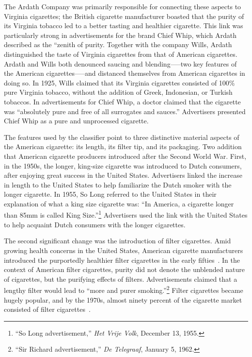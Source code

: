 \documentclass[USenglish]{article}
\begin{document}
The Ardath Company was primarily responsible for connecting these aspects to Virginia cigarettes; the British cigarette manufacturer boasted that the purity of its Virginia tobacco led to a better tasting and healthier cigarette. This link was particularly strong in advertisements for the brand Chief Whip, which Ardath described as the ``zenith of purity. Together with the company Wills, Ardath distinguished the taste of Virginia cigarettes from that of American cigarettes. Ardath and Wills both denounced saucing and blending--—two key features of the American cigarettes—--and distanced themselves from American cigarettes in doing so. In 1925, Wills claimed that its Virginia cigarettes consisted of 100\% pure Virginia tobacco, without the addition of Greek, Indonesian, or Turkish tobaccos. In advertisements for Chief Whip, a doctor claimed that the cigarette was ``absolutely pure and free of all surrogates and sauces.'' Advertisers presented Chief Whip as a pure and unprocessed cigarette.

The features used by the classifier point to three distinctive material aspects of the American cigarette: its length, its filter tip, and its packaging. Two addition that American cigarette producers introduced after the Second World War. 
%
First, in the 1950s, the longer, king-size cigarette was introduced to Dutch consumers, after enjoying great success in the United States. Advertisers linked the increase in length to the United States to help familiarize the Dutch smoker with the longer cigarette. In 1955, So Long referred to the United States in their explanation of what a king size cigarette was: ``In America, a cigarette longer than 85mm is called King Size.''\footnote{``So Long advertisement,'' \textit{Het Vrije Volk}, December 13, 1955.} Advertisers used the link with the United States to help acquaint Dutch consumers with the longer cigarettes.

The second significant change was the introduction of filter cigarettes. Amid growing health concerns in the United States, American cigarette manufacturers introduced the purportedly healthier filter cigarettes in the early fifties~\cite[244]{brandt_cigarette_2009}. In the context of American filter cigarettes, purity did not denote the unblended nature of cigarettes, but the purifying effects of filters. Advertisements claimed that a lengthy filter would lead to ``more and purer smoking.''\footnote{``Sir Richard advertisement,'' \textit{De Telegraaf}, January 5, 1962.} Filter cigarettes became hugely popular, and by the 1970s, almost ninety percent of the cigarette market consisted of filter cigarettes~\cite[244]{brandt_cigarette_2009}. 
\end{document}
